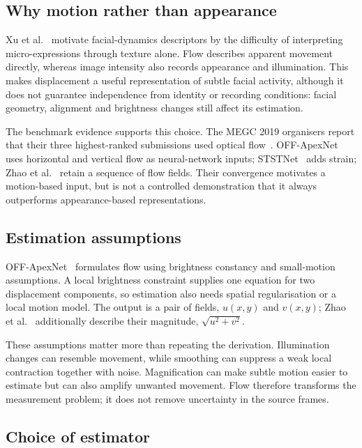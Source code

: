 \subsection{Why motion rather than appearance}
\label{sec:why-flow}

Xu et al.~\cite{xu2017} motivate facial-dynamics descriptors by the difficulty of interpreting micro-expressions through texture alone. Flow describes apparent movement directly, whereas image intensity also records appearance and illumination. This makes displacement a useful representation of subtle facial activity, although it does not guarantee independence from identity or recording conditions: facial geometry, alignment and brightness changes still affect its estimation.

The benchmark evidence supports this choice. The MEGC 2019 organisers report that their three highest-ranked submissions used optical flow~\cite{see2019}. OFF-ApexNet~\cite{liong2019a} uses horizontal and vertical flow as neural-network inputs; STSTNet~\cite{liong2019b} adds strain; Zhao et al.~\cite{zhaoS2021} retain a sequence of flow fields. Their convergence motivates a motion-based input, but is not a controlled demonstration that it always outperforms appearance-based representations.

\subsection{Estimation assumptions}
\label{sec:brightness-constancy}

OFF-ApexNet~\cite{liong2019a} formulates flow using brightness constancy and small-motion assumptions. A local brightness constraint supplies one equation for two displacement components, so estimation also needs spatial regularisation or a local motion model. The output is a pair of fields, $u(x,y)$ and $v(x,y)$; Zhao et al.~\cite{zhaoS2021} additionally describe their magnitude, $\sqrt{u^2+v^2}$.

These assumptions matter more than repeating the derivation. Illumination changes can resemble movement, while smoothing can suppress a weak local contraction together with noise. Magnification can make subtle motion easier to estimate but can also amplify unwanted movement. Flow therefore transforms the measurement problem; it does not remove uncertainty in the source frames.

\subsection{Choice of estimator}
\label{sec:flow-estimator}

